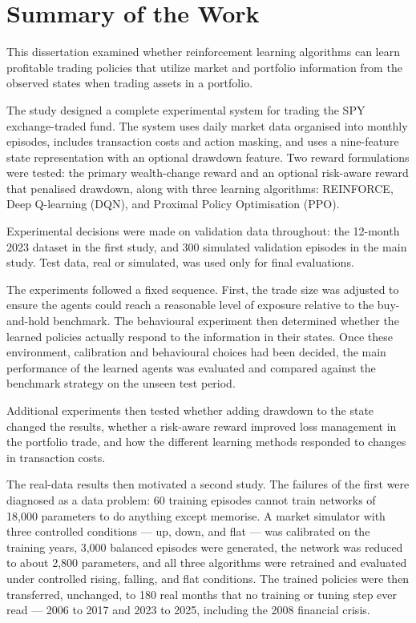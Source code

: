 \section{Summary of the Work}

This dissertation examined whether reinforcement learning algorithms can
learn profitable trading policies that utilize market and portfolio
information from the observed states when trading assets in a portfolio.

The study designed a complete experimental system for trading the SPY
exchange-traded fund. The system uses daily market data organised into
monthly episodes, includes transaction costs and action masking, and
uses a nine-feature state representation with an optional drawdown
feature. Two reward formulations were tested: the primary wealth-change
reward and an optional risk-aware reward that penalised drawdown, along
with three learning algorithms: REINFORCE, Deep Q-learning (DQN), and
Proximal Policy Optimisation (PPO).

Experimental decisions were made on validation data throughout: the
12-month 2023 dataset in the first study, and 300 simulated validation
episodes in the main study. Test data, real or simulated, was used only
for final evaluations.

The experiments followed a fixed sequence. First, the trade size was
adjusted to ensure the agents could reach a reasonable level of exposure
relative to the buy-and-hold benchmark. The behavioural experiment then
determined whether the learned policies actually respond to the
information in their states. Once these environment, calibration and
behavioural choices had been decided, the main performance of the
learned agents was evaluated and compared against the benchmark strategy
on the unseen test period.

Additional experiments then tested whether adding drawdown to the state
changed the results, whether a risk-aware reward improved loss
management in the portfolio trade, and how the different learning
methods responded to changes in transaction costs.

The real-data results then motivated a second study. The failures of the
first were diagnosed as a data problem: 60 training episodes cannot
train networks of 18,000 parameters to do anything except memorise. A
market simulator with three controlled conditions --- up, down, and flat
--- was calibrated on the training years,
3,000 balanced episodes were generated, the network was reduced to about
2,800 parameters, and all three algorithms were retrained and evaluated
under controlled rising, falling, and flat conditions. The trained
policies were then transferred, unchanged, to 180 real months that no
training or tuning step ever read --- 2006 to 2017 and 2023 to 2025,
including the 2008 financial crisis.

